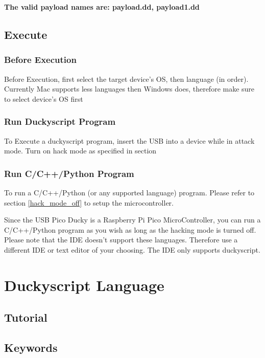 \documentclass[a4paper,12pt]{article}
\begin{document}
\textbf{The valid payload names are: payload.dd, payload1.dd}

\subsection{Execute}

\subsubsection{Before Execution}

Before Execution, first select the target device's OS, then language (in order). Currently Mac supports less languages then Windows does, therefore make sure to select device's OS first

\subsubsection{Run Duckyscript Program}

To Execute a duckyscript program, insert the USB into a device while in attack mode. Turn on hack mode as specified in section \label{hack_mode_on}

\subsubsection{Run C/C++/Python Program}

To run a C/C++/Python (or any supported language) program. Please refer to section \ref{hack_mode_off} to setup the microcontroller.

Since the USB Pico Ducky is a Raspberry Pi Pico MicroController, you can run a C/C++/Python program as you wish as long as the hacking mode is turned off. Please note that the IDE doesn't support these languages. Therefore use a different IDE or text editor of your choosing. The IDE only supports duckyscript.

\section{Duckyscript Language}

\subsection{Tutorial}

\subsection{Keywords}
\end{document}
